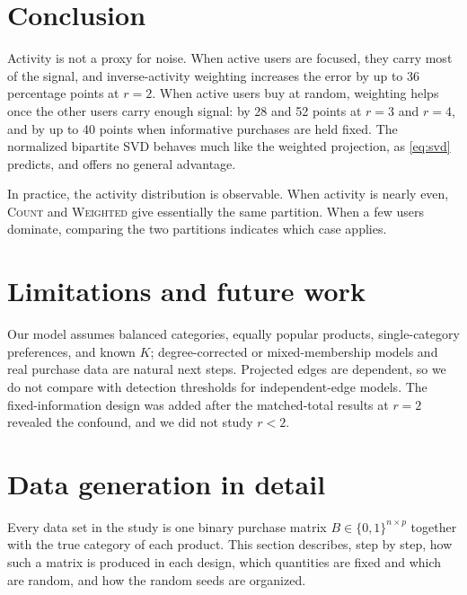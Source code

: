 \documentclass[12pt]{article}
\newcommand{\Count}{\textsc{Count}}
\newcommand{\Wtd}{\textsc{Weighted}}
\begin{document}
\section{Conclusion}

Activity is not a proxy for noise. When active users are focused, they carry
most of the signal, and inverse-activity weighting increases the error by up
to 36 percentage points at $r=2$. When active users buy at random, weighting
helps once the other users carry enough signal: by 28 and 52 points at $r=3$
and $r=4$, and by up to 40 points when informative purchases are held fixed.
The normalized bipartite SVD behaves much like the weighted projection, as
\eqref{eq:svd} predicts, and offers no general advantage.

In practice, the activity distribution is observable. When activity is nearly
even, \Count{} and \Wtd{} give essentially the same partition. When a few
users dominate, comparing the two partitions indicates which case applies.

\section{Limitations and future work}

Our model assumes balanced categories, equally popular products, single-category
preferences, and known $K$; degree-corrected or mixed-membership models and
real purchase data are natural next steps. Projected edges are dependent, so
we do not compare with detection thresholds for independent-edge models. The
fixed-information design was added after the matched-total results at $r=2$
revealed the confound, and we did not study $r<2$.




\clearpage
\appendix
\renewcommand{\thefigure}{A\arabic{figure}}
\renewcommand{\thetable}{A\arabic{table}}
\setcounter{figure}{0}
\setcounter{table}{0}

\section{Data generation in detail}
\label{app:generation}
Every data set in the study is one binary purchase matrix $B\in\{0,1\}^{n\times p}$ together with the true category of each product. This section describes, step by step, how such a matrix is produced in each design, which quantities are fixed and which are random, and how the random seeds are organized.
\end{document}
